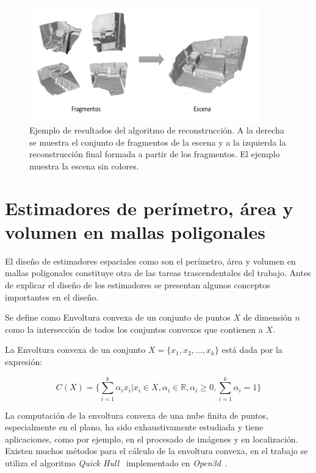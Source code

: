 \begin{figure}[ht]
	\centering
	\includegraphics[width=10cm]{./Graphics/algo3d.png}
	\caption{Ejemplo de resultados del algoritmo de reconstrucción. A la derecha se muestra el conjunto de fragmentos de la escena y a la izquierda la reconstrucción final formada a partir de los fragmentos. El ejemplo muestra la escena sin colores.}
\end{figure}

\section{Estimadores de perímetro, área y volumen en mallas poligonales}\label{section:measure}

El diseño de estimadores espaciales como son el perímetro, área y volumen en mallas poligonales constituye otra de las tareas trascendentales del trabajo. Antes de explicar el diseño de los estimadores se presentan algunos conceptos importantes en el diseño.

\begin{definition}
	Se define como Envoltura convexa de un conjunto de puntos $X$ de dimensión $n$ como la intersección de todos los conjuntos convexos que contienen a $X$. 
\end{definition}

La Envoltura convexa de un conjunto $X = \{x_1, x_2, \ldots, x_k\}$ está dada por la expresión:

$$ C(X) = \bigg\{\sum_{i = 1}^{k} \alpha_i x_i | x_i \in X, \alpha_i \in \mathbb{R}, \alpha_i \geq 0, \sum_{i = 1}^{k} \alpha_i = 1\bigg\}$$

La computación de la envoltura convexa de una nube finita de puntos, especialmente en el plano, ha sido exhaustivamente estudiada y tiene aplicaciones, como por ejemplo, en el procesado de imágenes y en localización. Existen muchos métodos para el cálculo de la envoltura convexa, en el trabajo se utiliza el algoritmo \textit{Quick Hull}~\cite{barber1996quickhull} implementado en \textit{Open3d}~\cite{zhou2018open3d}.

